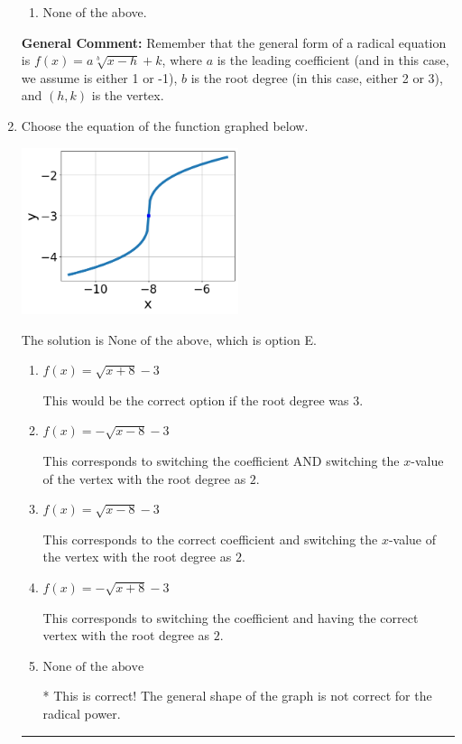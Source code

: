 \documentclass{extbook}[14pt]
\newcommand{\litem}[1]{\item #1

\rule{\textwidth}{0.4pt}}
\begin{document}
\begin{enumerate}
{\begin{enumerate}[label=\Alph*.]
\begin{multicols}{2}
\end{multicols}\item None of the above.\end{enumerate}
\textbf{General Comment:} Remember that the general form of a radical equation is $ f(x) = a \sqrt[b]{x - h} + k $, where $a$ is the leading coefficient (and in this case, we assume is either 1 or -1), $b$ is the root degree (in this case, either 2 or 3), and $(h, k)$ is the vertex.
}
\litem{
Choose the equation of the function graphed below.

\begin{center}
    \includegraphics[width=0.5\textwidth]{../Figures/radicalGraphToEquationA.png}
\end{center}


The solution is \( \text{None of the above} \), which is option E.\begin{enumerate}[label=\Alph*.]
\item \( f(x) = \sqrt{x + 8} - 3 \)

This would be the correct option if the root degree was $3$.
\item \( f(x) = - \sqrt{x - 8} - 3 \)

This corresponds to switching the coefficient AND switching the $x$-value of the vertex with the root degree as $2$.
\item \( f(x) = \sqrt{x - 8} - 3 \)

This corresponds to the correct coefficient and switching the $x$-value of the vertex with the root degree as $2$.
\item \( f(x) = - \sqrt{x + 8} - 3 \)

This corresponds to switching the coefficient and having the correct vertex with the root degree as $2$.
\item \( \text{None of the above} \)

* This is correct! The general shape of the graph is not correct for the radical power.
\end{enumerate}

}
\end{enumerate}
\end{document}
